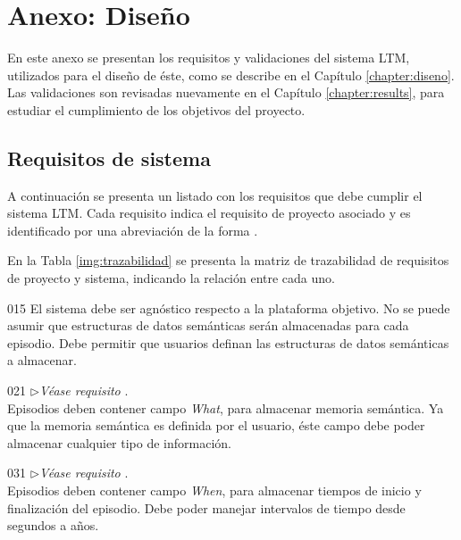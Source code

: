 \chapter{Anexo: Diseño}\label{chapter:appendix_a}

En este anexo se presentan los requisitos y validaciones del sistema LTM, utilizados para el diseño de éste, como se describe en el Capítulo  \ref{chapter:diseno}. Las validaciones son revisadas nuevamente en el Capítulo \ref{chapter:results}, para estudiar el cumplimiento de los objetivos del proyecto. 

\section{Requisitos de sistema}\label{appendix:req-sistema}

A continuación se presenta un listado con los requisitos que debe cumplir el sistema LTM. Cada requisito indica el requisito de proyecto asociado y es identificado por una abreviación de la forma .

En la Tabla \ref{img:trazabilidad} se presenta la matriz de trazabilidad de requisitos de proyecto y sistema, indicando la relación entre cada uno.

\newenvironment{requisito-sistema}[2]
{
	\noindent{\bfseries Requisito \RSlabel{#1}}
	\hfill\textit{(Derivado de }\RPlabel{#2})\\
}{}
\newcommand{\RSlinkStachowicz}[1]{$\triangleright$\textit{Véase requisito }\RStachowicz{#1}.\\}

\begin{requisito-sistema}{01}{5}
	El sistema debe ser agnóstico respecto a la plataforma objetivo. No se puede asumir que estructuras de datos semánticas serán almacenadas para cada episodio. Debe permitir que usuarios definan las estructuras de datos semánticas a almacenar.
\end{requisito-sistema}

\begin{requisito-sistema}{02}{1}
	\RSlinkStachowicz{1}
	Episodios deben contener campo \textit{What}, para almacenar memoria semántica. Ya que la memoria semántica es definida por el usuario, éste campo debe poder almacenar cualquier tipo de información.	
\end{requisito-sistema}

\begin{requisito-sistema}{03}{1}
	\RSlinkStachowicz{1}
	Episodios deben contener campo \textit{When}, para almacenar tiempos de inicio y finalización del episodio. Debe poder manejar intervalos de tiempo desde segundos a años.	
\end{requisito-sistema}

